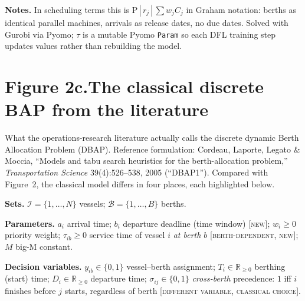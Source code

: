 \documentclass[11pt]{article}
\begin{document}
\vspace{0.3em}

\noindent\textbf{Notes.}
In scheduling terms this is $\mathrm{P}\,|\,r_j\,|\,\sum w_j C_j$ in
Graham notation: berths as identical parallel machines, arrivals as
release dates, no due dates. Solved with Gurobi via Pyomo; $\tau$ is
a mutable Pyomo \texttt{Param} so each DFL training step updates
values rather than rebuilding the model.

\newpage

\section*{Figure 2c.\quad The classical discrete BAP from the literature}

\noindent
What the operations-research literature actually calls the discrete
dynamic Berth Allocation Problem (DBAP). Reference formulation:
Cordeau, Laporte, Legato \& Moccia, ``Models and tabu search heuristics
for the berth-allocation problem,'' \emph{Transportation Science}
39(4):526--538, 2005 (``DBAP1''). Compared with Figure~2, the
classical model differs in four places, each highlighted below.

\vspace{0.5em}

\noindent\textbf{Sets.}
$\mathcal{I}=\{1,\dots,N\}$ vessels;\;
$\mathcal{B}=\{1,\dots,B\}$ berths.

\smallskip
\noindent\textbf{Parameters.}
$a_i$ arrival time;\;
$b_i$ departure deadline (time window) \textsc{[new]};\;
$w_i\geq 0$ priority weight;\;
$\tau_{ib}\geq 0$ service time of vessel $i$ \emph{at berth $b$}
\textsc{[berth-dependent, new]};\;
$M$ big-M constant.

\smallskip
\noindent\textbf{Decision variables.}
$y_{ib}\in\{0,1\}$ vessel--berth assignment;\;
$T_i\in\mathbb{R}_{\geq 0}$ berthing (start) time;\;
$D_i\in\mathbb{R}_{\geq 0}$ departure time;\;
$\sigma_{ij}\in\{0,1\}$ \emph{cross-berth} precedence: $1$ iff $i$
finishes before $j$ starts, regardless of berth
\textsc{[different variable, classical choice]}.

\vspace{0.4em}
\end{document}
